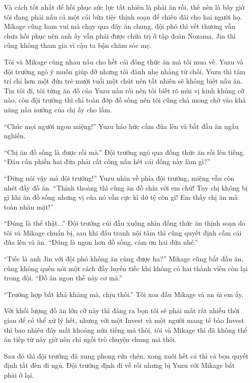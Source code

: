 {Và cách tốt nhất để hồi phục sức lực tất nhiên là phải ăn rồi, thế nên
là bây giờ tôi đang phải nấu cả một cái bữa tiệc thịnh soạn để chiêu đãi
cho hai người họ. Mikage cũng ham vui mà chạy qua đây ăn chung, đội phó
thì vết thương vẫn chưa hồi phục nên anh ấy vẫn phải được chữa trị ở tập
đoàn Nozama, Jin thì cũng không tham gia vì cậu ta bận chăm sóc mẹ.

Tôi và Mikage cùng nhau nấu cho hết cái đống thức ăn mà tôi mua về. Yuzu
và đội trưởng ngỏ ý muốn giúp đỡ nhưng tôi đành nhẹ nhàng từ chối, Yuzu
thì tâm trí chỉ hơn một đứa trẻ mười tuổi một chút nên tất nhiên sẽ
không biết nấu ăn. Tin tôi đi, tôi từng ăn đồ của Yuzu nấu rồi nên tôi
biết rõ mùi vị kinh khủng cỡ nào, còn đội trưởng thì chỉ toàn đớp đồ
sống nên tôi cũng chả mong chờ vào khả năng nấu nướng của chị ấy cho
lắm.

``Chúc mọi người ngon miệng!'' Yuzu háo hức cầm đũa lên và bắt đầu ăn
ngấu nghiến.

``Chị ăn đồ sống là được rồi mà.'' Đội trưởng ngó qua đống thức ăn rồi
lên tiếng. ``Đâu cần phiền hai đứa phải cất công nấu hết cái đống này
làm gì?''

``Đừng nói vậy mà đội trưởng!'' Yuzu nhìn về phía đội trưởng, miệng vẫn
còn nhét đầy đồ ăn. ``Thỉnh thoảng thì cũng ăn đồ chín với em chứ! Tuy
chị không bị gì khi ăn đồ sống nhưng vị của nó vẫn cực kì dở tệ còn gì!
Em thấy chị ăn mà toàn nhăn mặt!''

``Đúng là thể thật...'' Đội trưởng cúi đầu xuống nhìn đống thức ăn thịnh
soạn do tôi và Mikage chuẩn bị, sau khi đấu tranh nội tâm thì cũng quyết
định cầm cái đũa lên và ăn. ``Đúng là ngon hơn đồ sống, cảm ơn hai đứa
nhé.''

``Tiếc là anh Jin với đội phó không ăn cùng được ha?'' Mikage cũng bắt
đầu ăn, cũng không quên nói một cách đầy luyến tiếc khi không có hai
thành viên còn lại trong đội. ``Đồ ăn ngon thế này cơ mà.''

``Trường hợp bất khả kháng mà, chịu thôi.'' Tôi xoa đầu Mikage và an ủi
em ấy.

Với khối lượng đồ ăn lớn cỡ này thì đáng ra bọn tôi sẽ phải mất rất
nhiều thời gian để có thể xử lý hết, nhưng với một Invest và một người
mang tế bào Invest thì bao nhiêu đây mất khoảng nửa tiếng mà thôi, tôi
và Mikage thì đã không thể ăn tiếp từ nãy giờ nên chỉ ngồi trò chuyện
chung mà thôi.

Sau đó thì đội trưởng đã xung phong rửa chén, xong xuôi hết cả thì cả
bọn quyết định tắt đèn đi ngủ. Đội trưởng định đi về rồi nhưng bị Yuzu
với Mikage bắt phải ở lại.

}
